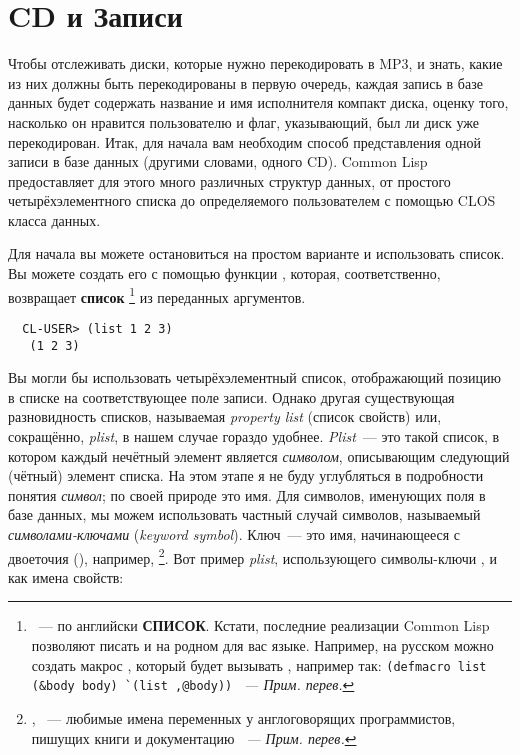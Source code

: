 \section{CD и Записи}

Чтобы отслеживать диски, которые нужно перекодировать в MP3, и знать, какие из них должны
быть перекодированы в первую очередь, каждая запись в базе данных будет содержать название
и имя исполнителя компакт диска, оценку того, насколько он нравится пользователю и флаг,
указывающий, был ли диск уже перекодирован. Итак, для начала вам необходим способ
представления одной записи в базе данных (другими словами, одного CD). Common Lisp
предоставляет для этого много различных структур данных, от простого четырёхэлементного
списка до определяемого пользователем с помощью CLOS класса данных.

Для начала вы можете остановиться на простом варианте и использовать список. Вы можете
создать его с помощью функции , которая, соответственно, возвращает
\textbf{список} \footnote{~--- по английски \textbf{СПИСОК}. Кстати, последние
  реализации Common Lisp позволяют писать и на родном для вас языке. Например, на русском
  можно создать макрос , который будет вызывать , например так:
  \lstinline!(defmacro list (&body body) `(list ,@body))! \textit{~--- Прим. перев.}} из
переданных аргументов.

\begin{verbatim}
  CL-USER> (list 1 2 3)
   (1 2 3)
\end{verbatim}

Вы могли бы использовать четырёхэлементный список, отображающий позицию в списке на
соответствующее поле записи. Однако другая существующая разновидность списков, называемая
\textit{property list} (список свойств) или, сокращённо, \textit{plist}, в нашем случае
гораздо удобнее. \textit{Plist}~--- это такой список, в котором каждый нечётный элемент
является \textit{символом}, описывающим следующий (чётный) элемент списка. На этом этапе я
не буду углубляться в подробности понятия \textit{символ}; по своей природе это имя. Для
символов, именующих поля в базе данных, мы можем использовать частный случай символов,
называемый \textit{символами-ключами} (\textit{keyword symbol}). Ключ~--- это имя,
начинающееся с двоеточия (\code{:}), например, \footnote{, 
 ~--- любимые имена переменных у англоговорящих программистов, пишущих книги и
  документацию \textit{~--- Прим. перев.}}. Вот пример \textit{plist}, использующего
символы-ключи ,  и  как имена свойств:

